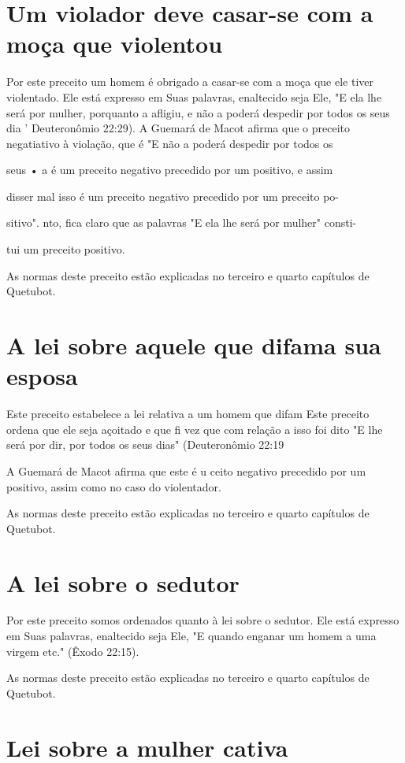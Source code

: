 \begin{itemize}
\begin{enumrate}
\begin{itemize}
\begin{itemize}
\begin{itemize}
\section{Um violador deve casar-se com a moça que violentou}

Por este preceito um homem é obrigado a casar-se com a moça que ele
tiver violentado. Ele está expresso em Suas palavras, enaltecido seja
Ele, "E ela lhe será por mulher, porquanto a afligiu, e não a poderá
despedir por todos os seus dia ' Deuteronômio 22:29). A Guemará de Macot
afirma que o precei­to negatiativo à violação, que é "E não a poderá
despedir por todos os

seus • a é um preceito negativo precedido por um positivo, e assim

disser mal isso é um preceito negativo precedido por um preceito po-

sitivo". nto, fica claro que as palavras "E ela lhe será por mulher"
consti-

tui um preceito positivo.

As normas deste preceito estão explicadas no terceiro e quarto
capí­tulos de Quetubot.

\section{A lei sobre aquele que difama sua esposa}

Este preceito estabelece a lei relativa a um homem que difam Este
preceito ordena que ele seja açoitado e que fi vez que com relação a
isso foi dito "E lhe será por dir, por todos os seus dias" (Deuteronômio
22:19

A Guemará de Macot afirma que este é u ceito negativo precedido
por um positivo, assim como no caso do violentador.

As normas deste preceito estão explicadas no terceiro e quarto
capí­tulos de Quetubot.

\section{A lei sobre o sedutor}

Por este preceito somos ordenados quanto à lei sobre o sedutor. Ele está
expresso em Suas palavras, enaltecido seja Ele, "E quando enganar um
ho­mem a uma virgem etc." (Êxodo 22:15).

As normas deste preceito estão explicadas no terceiro e quarto
capí­tulos de Quetubot.

\section{Lei sobre a mulher cativa}


\end{itemize}
\end{itemize}
\end{itemize}
\end{enumrate}
\end{itemize}
